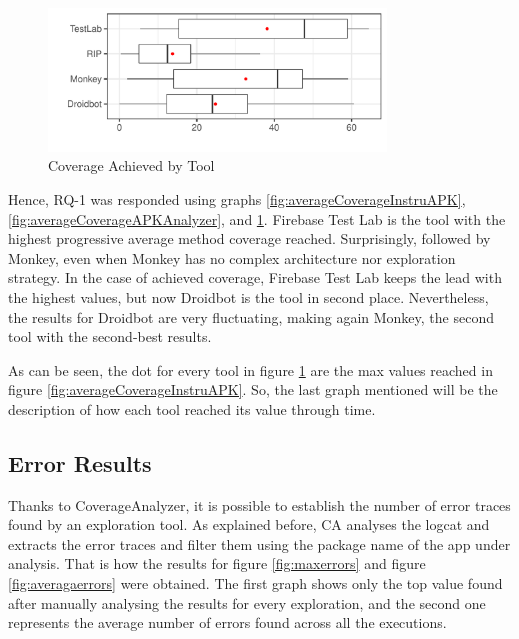 \begin{figure}[h]
\centering
\includegraphics[width=0.8\textwidth]{../Figures/boxplotAccumulated.pdf}
\caption{Coverage Achieved by Tool}\label{fig:boxplotAccumulated}
\end{figure}


Hence, RQ-1 was responded using graphs \ref{fig:averageCoverageInstruAPK}, \ref{fig:averageCoverageAPKAnalyzer}, and \ref{fig:boxplotAccumulated}. Firebase Test Lab is the tool with the highest progressive average method coverage reached. Surprisingly, followed by Monkey, even when Monkey has no complex architecture nor exploration strategy. In the case of achieved coverage, Firebase Test Lab keeps the lead with the highest values, but now Droidbot is the tool in second place. Nevertheless, the results for Droidbot are very fluctuating, making again Monkey, the second tool with the second-best results. 

As can be seen, the dot for every tool in figure \ref{fig:boxplotAccumulated} are the max values reached in figure \ref{fig:averageCoverageInstruAPK}. So, the last graph mentioned will be the description of how each tool reached its value through time.

\subsection{Error Results}\label{sec:errorResults}

Thanks to CoverageAnalyzer, it is possible to establish the number of error traces found by an exploration tool. As explained before, CA analyses the logcat and extracts the error traces and filter them using the package name of the app under analysis. That is how the results for 
figure \ref{fig:maxerrors} and figure \ref{fig:averagaerrors} were obtained. The first graph shows only the top value found after manually analysing the results for every exploration, and the second one represents the average number of errors found across all the executions.
 

